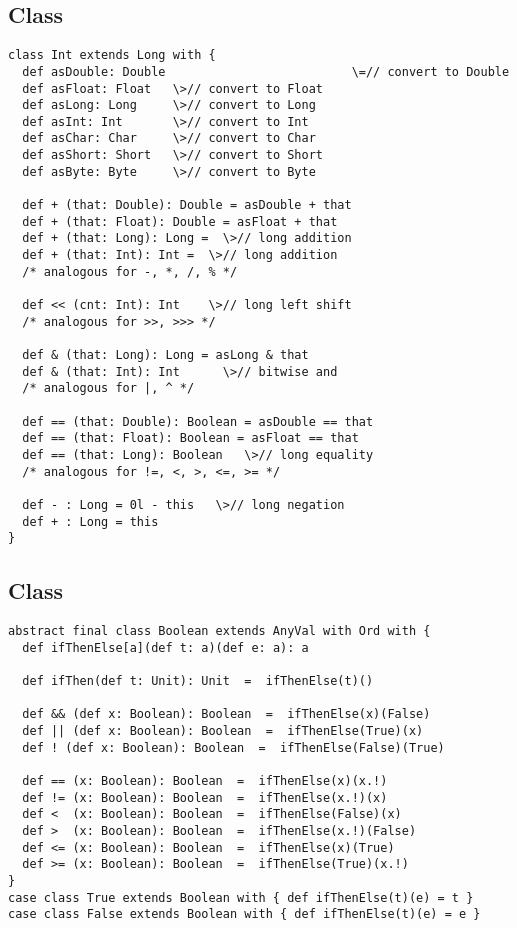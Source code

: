\documentclass[11pt]{report}
\begin{document}
\subsection{Class }

\begin{verbatim}
class Int extends Long with {
  def asDouble: Double                          \=// convert to Double
  def asFloat: Float   \>// convert to Float
  def asLong: Long     \>// convert to Long
  def asInt: Int       \>// convert to Int
  def asChar: Char     \>// convert to Char
  def asShort: Short   \>// convert to Short
  def asByte: Byte     \>// convert to Byte

  def + (that: Double): Double = asDouble + that
  def + (that: Float): Double = asFloat + that
  def + (that: Long): Long =  \>// long addition
  def + (that: Int): Int =  \>// long addition
  /* analogous for -, *, /, % */

  def << (cnt: Int): Int    \>// long left shift
  /* analogous for >>, >>> */

  def & (that: Long): Long = asLong & that
  def & (that: Int): Int      \>// bitwise and
  /* analogous for |, ^ */

  def == (that: Double): Boolean = asDouble == that
  def == (that: Float): Boolean = asFloat == that
  def == (that: Long): Boolean   \>// long equality
  /* analogous for !=, <, >, <=, >= */

  def - : Long = 0l - this   \>// long negation
  def + : Long = this
}
\end{verbatim}

\subsection{Class }
\label{sec:cls-boolean}

\begin{verbatim}
abstract final class Boolean extends AnyVal with Ord with {
  def ifThenElse[a](def t: a)(def e: a): a

  def ifThen(def t: Unit): Unit  =  ifThenElse(t)()

  def && (def x: Boolean): Boolean  =  ifThenElse(x)(False)
  def || (def x: Boolean): Boolean  =  ifThenElse(True)(x)
  def ! (def x: Boolean): Boolean  =  ifThenElse(False)(True)

  def == (x: Boolean): Boolean  =  ifThenElse(x)(x.!)
  def != (x: Boolean): Boolean  =  ifThenElse(x.!)(x)
  def <  (x: Boolean): Boolean  =  ifThenElse(False)(x)
  def >  (x: Boolean): Boolean  =  ifThenElse(x.!)(False)
  def <= (x: Boolean): Boolean  =  ifThenElse(x)(True)
  def >= (x: Boolean): Boolean  =  ifThenElse(True)(x.!)
}
case class True extends Boolean with { def ifThenElse(t)(e) = t }
case class False extends Boolean with { def ifThenElse(t)(e) = e }
\end{verbatim}
\end{document}
